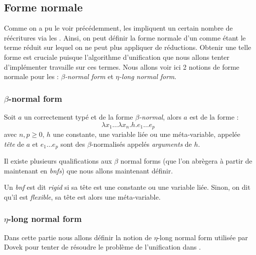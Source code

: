 \subsection{Forme normale}

Comme on a pu le voir précédemment, les \lexps{} impliquent un certain nombre de réécritures via les \breds{}. Ainsi, on peut définir la forme normale d'un \lterm{} comme étant le terme réduit sur lequel on ne peut plus appliquer de réductions. Obtenir une telle forme est cruciale puisque l'algorithme d'unification que nous allons tenter d'implémenter travaille sur ces termes.
Nous allons voir ici 2 notions de forme normale pour les \lterms{} : \textit{$\beta$-normal form} et \textit{$\eta$-long normal form}.

\subsubsection{$\beta$-normal form}

\begin{defn}
Soit $a$ un \lterm{} correctement typé et de la forme \textit{$\beta$-normal}, alors $a$ est de la forme :
\[
    \lambda x_1 \dots \lambda x_n . h . e_1 \dots e_p
\]
avec $n, p \geq 0$, $h$ une constante, une variable liée ou une méta-variable, appelée \textit{tête} de $a$ et $e_1 \dots e_p$ sont des \lterms{} $\beta$-normalisés appelés \textit{arguments} de $h$.
\end{defn}

Il existe plusieurs qualifications aux $\beta$ normal forms (que l'on abrègera à partir de maintenant en \textit{bnfs}) que nous allons maintenant définir.

\begin{defn}
Un \lterm{} \textit{bnf} est dit \textit{rigid} si sa tête est une constante ou une variable liée. Sinon, on dit qu'il est \textit{flexible}, sa tête est alors une méta-variable.
\end{defn}

\subsubsection{$\eta$-long normal form}
Dans cette partie nous allons définir la notion de $\eta$-long normal form utilisée par Dovek pour tenter de résoudre le problème de l'unification dans \cite{dowek1995higher}.

